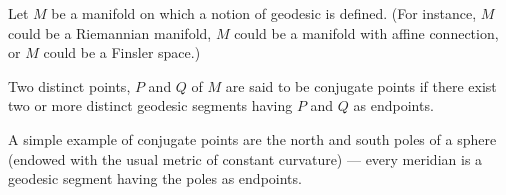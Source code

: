 \documentclass[12pt]{article}
\begin{document}
Let $M$ be a manifold on which a notion of geodesic is defined.  (For instance, $M$ could be a Riemannian manifold, $M$ could be a manifold with affine connection, or $M$ could be a Finsler space.)

Two distinct points, $P$ and $Q$ of $M$ are said to be conjugate points if there exist two or more distinct geodesic segments having $P$ and $Q$ as endpoints.

A simple example of conjugate points are the north and south poles of a sphere (endowed with the usual metric of constant curvature) --- every meridian is a geodesic segment having the poles as endpoints.
\end{document}
